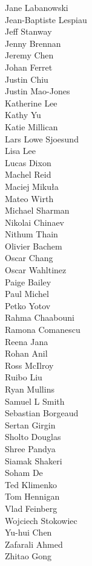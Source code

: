 \documentclass[11pt, a4paper, logo, twocolumn, copyright, nonumbering]{googledeepmind}
\begin{document}
Jane Labanowski \\
Jean-Baptiste Lespiau \\
Jeff Stanway \\
Jenny Brennan \\
Jeremy Chen \\
Johan Ferret \\
Justin Chiu \\
Justin Mao-Jones \\
Katherine Lee \\
Kathy Yu \\
Katie Millican \\
Lars Lowe Sjoesund \\
Lisa Lee \\
Lucas Dixon \\
Machel Reid \\
Maciej Mikuła \\
Mateo Wirth \\
Michael Sharman \\
Nikolai Chinaev \\
Nithum Thain \\
Olivier Bachem \\
Oscar Chang \\
Oscar Wahltinez \\
Paige Bailey \\
Paul Michel \\
Petko Yotov \\
Rahma Chaabouni \\
Ramona Comanescu  \\
Reena Jana \\
Rohan Anil \\
Ross McIlroy \\
Ruibo Liu \\
Ryan Mullins \\
Samuel L Smith \\
Sebastian Borgeaud \\
Sertan Girgin \\
Sholto Douglas \\
Shree Pandya \\
Siamak Shakeri \\
Soham De \\
Ted Klimenko \\
Tom Hennigan \\
Vlad Feinberg \\
Wojciech Stokowiec \\
Yu-hui Chen \\
Zafarali Ahmed \\
Zhitao Gong
\end{document}
